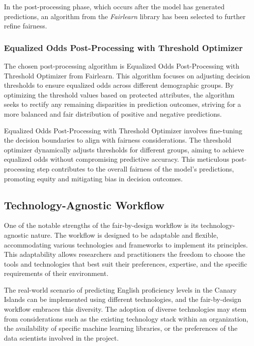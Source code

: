 \documentclass[12pt,a4paper,openright,twoside]{book}
\begin{document}
In the post-processing phase, which occurs after the model has generated predictions, an algorithm from the \emph{Fairlearn} library has been selected to further refine fairness.

\subsubsection{Equalized Odds Post-Processing with Threshold Optimizer}

The chosen post-processing algorithm is Equalized Odds Post-Processing with Threshold Optimizer from Fairlearn. This algorithm focuses on adjusting decision thresholds to ensure equalized odds across different demographic groups. By optimizing the threshold values based on protected attributes, the algorithm seeks to rectify any remaining disparities in prediction outcomes, striving for a more balanced and fair distribution of positive and negative predictions. \cite{10.5555/3157382.3157469}

Equalized Odds Post-Processing with Threshold Optimizer involves fine-tuning the decision boundaries to align with fairness considerations. The threshold optimizer dynamically adjusts thresholds for different groups, aiming to achieve equalized odds without compromising predictive accuracy. This meticulous post-processing step contributes to the overall fairness of the model's predictions, promoting equity and mitigating bias in decision outcomes. 

\subsection{Technology-Agnostic Workflow}

One of the notable strengths of the fair-by-design workflow is its technology-agnostic nature. The workflow is designed to be adaptable and flexible, accommodating various technologies and frameworks to implement its principles. This adaptability allows researchers and practitioners the freedom to choose the tools and technologies that best suit their preferences, expertise, and the specific requirements of their environment.

The real-world scenario of predicting English proficiency levels in the Canary Islands can be implemented using different technologies, and the fair-by-design workflow embraces this diversity. The adoption of diverse technologies may stem from considerations such as the existing technology stack within an organization, the availability of specific machine learning libraries, or the preferences of the data scientists involved in the project.
\end{document}
